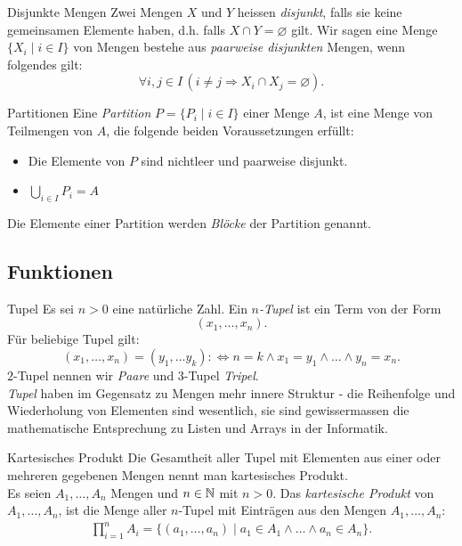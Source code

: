 \begin{definition}{Disjunkte Mengen}
    Zwei Mengen $X$ und $Y$ heissen \textit{disjunkt}, falls sie keine gemeinsamen Elemente haben, d.h. falls $X\cap Y=\varnothing$ gilt. Wir sagen eine Menge $\{X_i\mid i\in I \}$ von Mengen bestehe aus \textit{paarweise disjunkten} Mengen, wenn folgendes gilt:
    \[
        \forall i,j\in I\,(i\neq j\Rightarrow X_i\cap X_j=\varnothing).
    \]
\end{definition}

\begin{definition}{Partitionen}
    Eine \textit{Partition} $P=\{P_i\mid i\in I \}$ einer Menge $A$, ist eine Menge von Teilmengen von $A$, die folgende beiden Voraussetzungen erfüllt:
    \begin{itemize}
        \item Die Elemente von $P$ sind nichtleer und paarweise disjunkt.
        \item $\bigcup_{i\in I}P_i=A$
    \end{itemize}
    Die Elemente einer Partition werden \textit{Blöcke} der Partition genannt.
\end{definition}

\subsection{Funktionen}

\begin{definition}{Tupel}
    Es sei $n>0$ eine natürliche Zahl. Ein $n$\textit{-Tupel} ist ein Term von der Form
    \[
        (x_1,\dots,x_n).
    \]
    Für beliebige Tupel gilt:
    \[
        (x_1,\dots,x_n)=(y_1,\dots y_k):\Leftrightarrow n=k\land x_1=y_1\land\dots\land y_n=x_n.
    \]
    $2$-Tupel nennen wir \textit{Paare} und $3$-Tupel \textit{Tripel}.\\
    \textit{Tupel} haben im Gegensatz zu Mengen mehr innere Struktur - die Reihenfolge und Wiederholung von Elementen sind wesentlich, sie sind gewissermassen die mathematische Entsprechung zu Listen und Arrays in der Informatik.
\end{definition}

\begin{definition}{Kartesisches Produkt}
    Die Gesamtheit aller Tupel mit Elementen aus einer oder mehreren gegebenen Mengen nennt man kartesisches Produkt.\\
    Es seien $A_1,\dots, A_n$ Mengen und $n\in\mathbb{N}$ mit $n>0$.
    Das \textit{kartesische Produkt} von $A_1,\dots, A_n$, ist die Menge aller $n$-Tupel mit Einträgen aus den Mengen $A_1,\dots ,A_n$:
    \begin{align*}
        \prod_{i=1}^{n}A_i=\big\{(a_1,\dots,a_n)\mid a_1\in A_1\land\dots\land a_n\in A_n \big\}.
    \end{align*}
\end{definition}


